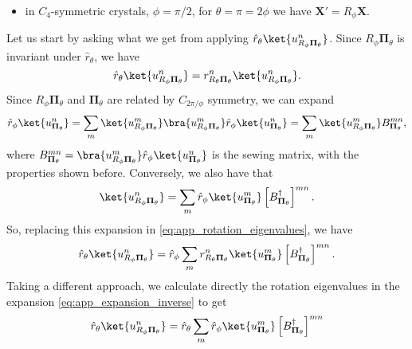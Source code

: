 {\begin{itemize}
\item in $C_4$-symmetric crystals, $\phi=\pi/2$, for $\theta=\pi=2\phi$ we have $\mathbf{X'}=R_\phi \mathbf{X}$.
\end{itemize}
Let us start by asking what we get from applying $\hat{r}_{\theta} \ket{u_{{R_\phi}{\mathbf \Pi_{\theta}}}^n}$. Since ${R_\phi}{\mathbf \Pi_{\theta}}$ is invariant under $\hat{r}_{\theta}$, we have
\begin{equation}
\hat{r}_{\theta} \ket{u_{{R_\phi}{\mathbf \Pi_{\theta}}}^n}=r_{R_{\theta} {\mathbf \Pi_{\theta}}}^n \ket{u_{{R_\phi}{\mathbf \Pi_{\theta}}}^n}.
\label{eq:app_rotation_eigenvalues}
\end{equation}
Since ${R_\phi}{\mathbf \Pi_{\theta}}$ and ${\mathbf \Pi_{\theta}}$ are related by $C_{2\pi/\phi}$ symmetry, we can expand
\begin{equation}
\hat{r}_\phi \ket{u_{{\mathbf \Pi}_{\theta}}^n} =\sum_m \ket{u_{R_\phi {\mathbf \Pi}_{\theta}}^m} \bra{u_{R_\phi {\mathbf \Pi}_{\theta}}^m}\hat{r}_\phi \ket{u_{{\mathbf \Pi}_{\theta}}^n} =\sum_m \ket{u_{R_\phi {\mathbf \Pi}_{\theta}}^m} B_{{\mathbf \Pi}_{\theta}}^{mn},
\label{eq:app_expansion}
\end{equation}
where $B_{{\mathbf \Pi}_{\theta}}^{mn}=\bra{u_{R_\phi {\mathbf \Pi}_{\theta}}^m}\hat{r}_\phi \ket{u_{{\mathbf \Pi}_{\theta}}^n}$ is the sewing matrix, with the properties shown before. Conversely, we also have that
\begin{equation}
\ket{u_{R_\phi {\mathbf \Pi}_{\theta}}^n}=\sum_m\hat{r}_\phi \ket{u_{{\mathbf \Pi}_{\theta}}^m}\left[B_{{\mathbf \Pi}_{\theta}}^{\dagger}\right]^{mn}.
\label{eq:app_expansion_inverse}
\end{equation}
So, replacing this expansion in \eqref{eq:app_rotation_eigenvalues}, we have
\begin{equation}
\hat{r}_{\theta} \ket{u_{R_\phi {\mathbf \Pi}_{\theta}}^n}= \hat{r}_\phi \sum_m r_{R_{\theta} {\mathbf \Pi_{\theta}}}^n \ket{u_{{\mathbf \Pi}_{\theta}}^m}\left[B_{{\mathbf \Pi}_{\theta}}^{\dagger}\right]^{mn}.
\label{eq:app_rotation_eigenvalues_exp1}
\end{equation}
Taking a different approach, we calculate directly the rotation eigenvalues in the expansion \eqref{eq:app_expansion_inverse} to get
\begin{equation}
\begin{aligned}
\hat{r}_{\theta} \ket{u_{R_\phi {\mathbf \Pi}_{\theta}}^n} &= \hat{r}_{\theta} \sum_m\hat{r}_\phi \ket{u_{{\mathbf \Pi}_{\theta}}^m}\left[B_{{\mathbf \Pi}_{\theta}}^{\dagger}\right]^{mn} \\

\end{aligned}
\end{equation}}
